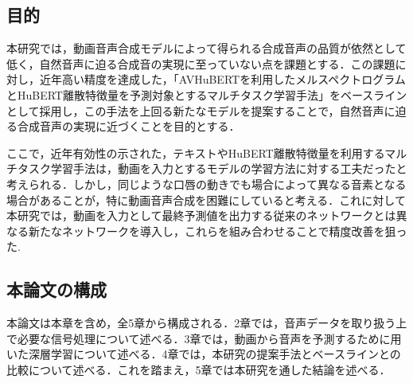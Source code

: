 \subsection{目的}
本研究では，動画音声合成モデルによって得られる合成音声の品質が依然として低く，自然音声に迫る合成音の実現に至っていない点を課題とする．この課題に対し，近年高い精度を達成した，「AVHuBERTを利用したメルスペクトログラムとHuBERT離散特徴量を予測対象とするマルチタスク学習手法」をベースラインとして採用し，この手法を上回る新たなモデルを提案することで，自然音声に迫る合成音声の実現に近づくことを目的とする．

ここで，近年有効性の示された，テキストやHuBERT離散特徴量を利用するマルチタスク学習手法は，動画を入力とするモデルの学習方法に対する工夫だったと考えられる．しかし，同じような口唇の動きでも場合によって異なる音素となる場合があることが，特に動画音声合成を困難にしていると考える．これに対して本研究では，動画を入力として最終予測値を出力する従来のネットワークとは異なる新たなネットワークを導入し，これらを組み合わせることで精度改善を狙った.

\subsection{本論文の構成}
本論文は本章を含め，全5章から構成される．2章では，音声データを取り扱う上で必要な信号処理について述べる．3章では，動画から音声を予測するために用いた深層学習について述べる．4章では，本研究の提案手法とベースラインとの比較について述べる．これを踏まえ，5章では本研究を通した結論を述べる．

